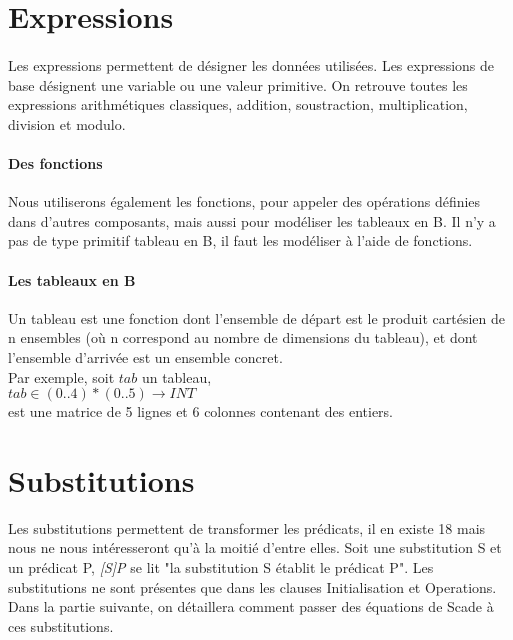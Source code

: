 
\section{Expressions}

\paragraph{}
Les expressions permettent de désigner les données utilisées. Les
expressions de base désignent une variable ou une valeur primitive.
On retrouve toutes les expressions arithmétiques classiques, addition,
soustraction, multiplication, division et modulo.

\paragraph{Des fonctions}

Nous utiliserons également les fonctions, pour appeler des opérations
définies dans d'autres composants, mais aussi pour modéliser les
tableaux en B. Il n'y a pas de type primitif tableau en B, il faut les
modéliser à l'aide de fonctions.

\paragraph{Les tableaux en B}
Un tableau est une fonction dont l'ensemble de départ est le produit
cartésien de n ensembles (où n correspond au nombre de dimensions du
tableau), et dont l'ensemble d'arrivée est un ensemble concret.\\
Par exemple, soit $tab$ un tableau, \\
$tab \in (0..4)*(0..5) \rightarrow INT$ \\
est une matrice de 5 lignes et 6 colonnes contenant des entiers.



\section{Substitutions}
Les substitutions permettent de transformer les prédicats, il en existe 18 mais
nous ne nous intéresseront qu'à la moitié d'entre elles. Soit une substitution S et un
prédicat P, \emph{[S]P} se lit "la substitution S établit le prédicat P".
Les substitutions ne sont présentes que dans les clauses Initialisation et
Operations. Dans la partie suivante, on détaillera comment passer des équations
de Scade à ces substitutions.


